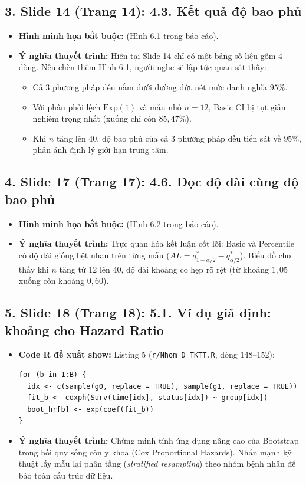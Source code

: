 \documentclass[10pt,a4paper]{article}
\begin{document}
\subsection*{3. Slide 14 (Trang 14): 4.3. Kết quả độ bao phủ}
\begin{itemize}
    \item \textbf{Hình minh họa bắt buộc:}  (Hình 6.1 trong báo cáo).
    \item \textbf{Ý nghĩa thuyết trình:} Hiện tại Slide 14 chỉ có một bảng số liệu gồm 4 dòng. Nếu chèn thêm Hình 6.1, người nghe sẽ lập tức quan sát thấy:
    \begin{itemize}
        \item Cả 3 phương pháp đều nằm dưới đường đứt nét mức danh nghĩa $95\%$.
        \item Với phân phối lệch $\text{Exp}(1)$ và mẫu nhỏ $n=12$, Basic CI bị tụt giảm nghiêm trọng nhất (xuống chỉ còn $85{,}47\%$).
        \item Khi $n$ tăng lên 40, độ bao phủ của cả 3 phương pháp đều tiến sát về $95\%$, phản ánh định lý giới hạn trung tâm.
    \end{itemize}
\end{itemize}

\subsection*{4. Slide 17 (Trang 17): 4.6. Đọc độ dài cùng độ bao phủ}
\begin{itemize}
    \item \textbf{Hình minh họa bắt buộc:}  (Hình 6.2 trong báo cáo).
    \item \textbf{Ý nghĩa thuyết trình:} Trực quan hóa kết luận cốt lõi: Basic và Percentile có độ dài giống hệt nhau trên từng mẫu ($AL = q_{1-\alpha/2}^* - q_{\alpha/2}^*$). Biểu đồ cho thấy khi $n$ tăng từ 12 lên 40, độ dài khoảng co hẹp rõ rệt (từ khoảng $1{,}05$ xuống còn khoảng $0{,}60$).
\end{itemize}

\subsection*{5. Slide 18 (Trang 18): 5.1. Ví dụ giả định: khoảng cho Hazard Ratio}
\begin{itemize}
    \item \textbf{Code R đề xuất show:} Listing 5 (\texttt{r/Nhom\_D\_TKTT.R}, dòng 148--152):
\begin{verbatim}
for (b in 1:B) {
  idx <- c(sample(g0, replace = TRUE), sample(g1, replace = TRUE))
  fit_b <- coxph(Surv(time[idx], status[idx]) ~ group[idx])
  boot_hr[b] <- exp(coef(fit_b))
}
\end{verbatim}
    \item \textbf{Ý nghĩa thuyết trình:} Chứng minh tính ứng dụng nâng cao của Bootstrap trong hồi quy sống còn y khoa (Cox Proportional Hazards). Nhấn mạnh kỹ thuật lấy mẫu lại phân tầng (\textit{stratified resampling}) theo nhóm bệnh nhân để bảo toàn cấu trúc dữ liệu.
\end{itemize}
\end{document}
